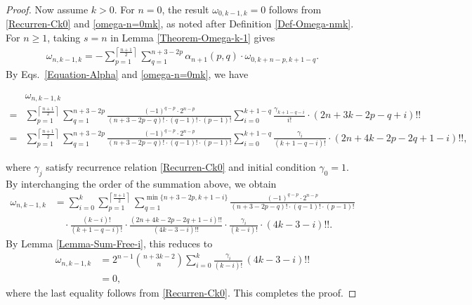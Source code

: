 \documentclass[reqno, 12pt]{article}
\theoremstyle{mydefinition}
\theoremstyle{myremark}
\numberwithin{algorithm}{section}
\begin{document}
\begin{proof}
Now assume $k>0$. For $n=0$, the result $\omega_{0,k-1,k}=0$ follows from \eqref{Recurren-Ck0} and \eqref{omega-n=0mk}, as noted after Definition \ref{Def-Omega-nmk}. For $n\ge 1$, taking $s=n$ in Lemma \ref{Theorem-Omega-k-1} gives
\begin{align}\label{Equation-S=N=0}
\omega_{n,k-1,k}=-\sum_{p=1}^{\left\lceil \frac{n+1}{2}\right\rceil} \sum_{q=1}^{n+3-2p} \alpha_{n+1}(p,q)\cdot \omega_{0,k+n-p,k+1-q}.
\end{align}
By Eqs.~\eqref{Equation-Alpha} and \eqref{omega-n=0mk}, we have
\begin{small}
\begin{align*}
& \omega_{n,k-1,k}
\\=&\sum_{p=1}^{\left\lceil \frac{n+1}{2}\right\rceil} \sum_{q=1}^{n+3-2p} \frac{(-1)^{q-p}\cdot 2^{n-p}}{(n+3-2p-q)!\cdot (q-1)!\cdot (p-1)!} \sum_{i=0}^{k+1-q} \frac{\gamma_{k+1-q-i}}{i!}\cdot (2n+3k-2p-q+i)!!
\\=& \sum_{p=1}^{\left\lceil \frac{n+1}{2}\right\rceil} \sum_{q=1}^{n+3-2p} \frac{(-1)^{q-p}\cdot 2^{n-p}}{(n+3-2p-q)!\cdot (q-1)!\cdot (p-1)!} \sum_{i=0}^{k+1-q} \frac{\gamma_{i}}{(k+1-q-i)!}\cdot (2n+4k-2p-2q+1-i)!!,
\end{align*}
\end{small}
where $\gamma_{j}$ satisfy recurrence relation \eqref{Recurren-Ck0} and initial condition $\gamma_{0}=1$. 
By interchanging the order of the summation above, we obtain
\begin{align*}
\omega_{n,k-1,k}
&= \sum_{i=0}^{k} \sum_{p=1}^{\left\lceil \frac{n+1}{2}\right\rceil} \sum_{q=1}^{\min\{n+3-2p, k+1-i\}} \frac{(-1)^{q-p}\cdot 2^{n-p}}{(n+3-2p-q)!\cdot (q-1)!\cdot (p-1)!}\\
&\quad \cdot \frac{(k-i)!}{(k+1-q-i)!} \cdot\frac{ (2n+4k-2p-2q+1-i)!!}{(4k-3-i)!!}\cdot\frac{\gamma_{i}}{(k-i)!}\cdot (4k-3-i)!!.
\end{align*}
By Lemma \ref{Lemma-Sum-Free-i}, this reduces to
\begin{align*}
\omega_{n,k-1,k}
&=2^{n-1}\binom{n+3k-2}{n}\sum_{i=0}^{k}\frac{\gamma_{i}}{(k-i)!}\, (4k-3-i)!!\\
&=0,
\end{align*}
where the last equality follows from \eqref{Recurren-Ck0}. This completes the proof.
\end{proof}
\end{document}
